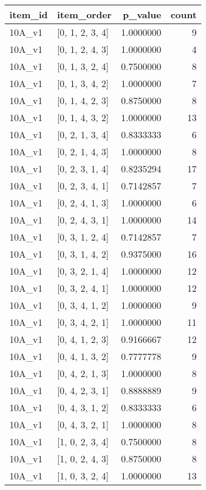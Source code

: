 \documentclass[]{book}
\theoremstyle{definition}
\theoremstyle{definition}
\theoremstyle{definition}
\theoremstyle{remark}
\begin{document}
\begin{tabular}{l|l|r|r}
\hline
item\_id & item\_order & p\_value & count\\
\hline
10A\_v1 & [0, 1, 2, 3, 4] & 1.0000000 & 9\\
\hline
10A\_v1 & [0, 1, 2, 4, 3] & 1.0000000 & 4\\
\hline
10A\_v1 & [0, 1, 3, 2, 4] & 0.7500000 & 8\\
\hline
10A\_v1 & [0, 1, 3, 4, 2] & 1.0000000 & 7\\
\hline
10A\_v1 & [0, 1, 4, 2, 3] & 0.8750000 & 8\\
\hline
10A\_v1 & [0, 1, 4, 3, 2] & 1.0000000 & 13\\
\hline
10A\_v1 & [0, 2, 1, 3, 4] & 0.8333333 & 6\\
\hline
10A\_v1 & [0, 2, 1, 4, 3] & 1.0000000 & 8\\
\hline
10A\_v1 & [0, 2, 3, 1, 4] & 0.8235294 & 17\\
\hline
10A\_v1 & [0, 2, 3, 4, 1] & 0.7142857 & 7\\
\hline
10A\_v1 & [0, 2, 4, 1, 3] & 1.0000000 & 6\\
\hline
10A\_v1 & [0, 2, 4, 3, 1] & 1.0000000 & 14\\
\hline
10A\_v1 & [0, 3, 1, 2, 4] & 0.7142857 & 7\\
\hline
10A\_v1 & [0, 3, 1, 4, 2] & 0.9375000 & 16\\
\hline
10A\_v1 & [0, 3, 2, 1, 4] & 1.0000000 & 12\\
\hline
10A\_v1 & [0, 3, 2, 4, 1] & 1.0000000 & 12\\
\hline
10A\_v1 & [0, 3, 4, 1, 2] & 1.0000000 & 9\\
\hline
10A\_v1 & [0, 3, 4, 2, 1] & 1.0000000 & 11\\
\hline
10A\_v1 & [0, 4, 1, 2, 3] & 0.9166667 & 12\\
\hline
10A\_v1 & [0, 4, 1, 3, 2] & 0.7777778 & 9\\
\hline
10A\_v1 & [0, 4, 2, 1, 3] & 1.0000000 & 8\\
\hline
10A\_v1 & [0, 4, 2, 3, 1] & 0.8888889 & 9\\
\hline
10A\_v1 & [0, 4, 3, 1, 2] & 0.8333333 & 6\\
\hline
10A\_v1 & [0, 4, 3, 2, 1] & 1.0000000 & 8\\
\hline
10A\_v1 & [1, 0, 2, 3, 4] & 0.7500000 & 8\\
\hline
10A\_v1 & [1, 0, 2, 4, 3] & 0.8750000 & 8\\
\hline
10A\_v1 & [1, 0, 3, 2, 4] & 1.0000000 & 13\\

\end{tabular}
\end{document}
